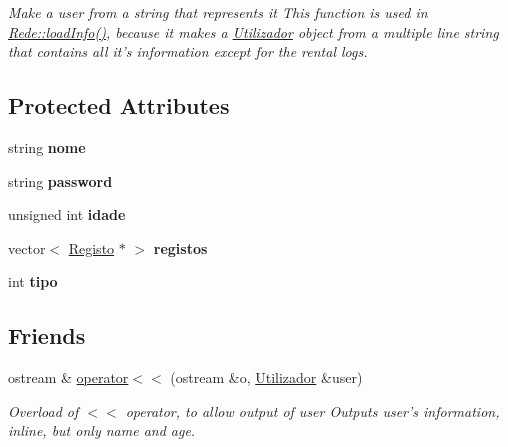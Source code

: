\begin{DoxyCompactItemize}
\begin{DoxyCompactList}\small\item\em Make a user from a string that represents it This function is used in \hyperlink{class_rede_a1751f922073f6172ba676a56959a1540}{Rede\+::load\+Info()}, because it makes a \hyperlink{class_utilizador}{Utilizador} object from a multiple line string that contains all it's information except for the rental logs. \end{DoxyCompactList}\end{DoxyCompactItemize}
\subsection*{Protected Attributes}
\begin{DoxyCompactItemize}
\item 
\hypertarget{class_utilizador_a3d22333263aef7b7a61a96b46ba7828d}{string {\bfseries nome}}\label{class_utilizador_a3d22333263aef7b7a61a96b46ba7828d}

\item 
\hypertarget{class_utilizador_aae4c416534c9b645e933cea05db50050}{string {\bfseries password}}\label{class_utilizador_aae4c416534c9b645e933cea05db50050}

\item 
\hypertarget{class_utilizador_aa4c6a81b2b5bb75690e9fb3c8d8412b6}{unsigned int {\bfseries idade}}\label{class_utilizador_aa4c6a81b2b5bb75690e9fb3c8d8412b6}

\item 
\hypertarget{class_utilizador_a2b89c422324741fe6e6aae6e90b8c792}{vector$<$ \hyperlink{class_registo}{Registo} $\ast$ $>$ {\bfseries registos}}\label{class_utilizador_a2b89c422324741fe6e6aae6e90b8c792}

\item 
\hypertarget{class_utilizador_a38d3b0129c3a6d7b68f59429b7003055}{int {\bfseries tipo}}\label{class_utilizador_a38d3b0129c3a6d7b68f59429b7003055}

\end{DoxyCompactItemize}
\subsection*{Friends}
\begin{DoxyCompactItemize}
\item 
ostream \& \hyperlink{class_utilizador_adc23de1728e267f4b2dc5aed8a410e9e}{operator$<$$<$} (ostream \&o, \hyperlink{class_utilizador}{Utilizador} \&user)
\begin{DoxyCompactList}\small\item\em Overload of $<$$<$ operator, to allow output of user Outputs user's information, inline, but only name and age. \end{DoxyCompactList}\end{DoxyCompactItemize}



